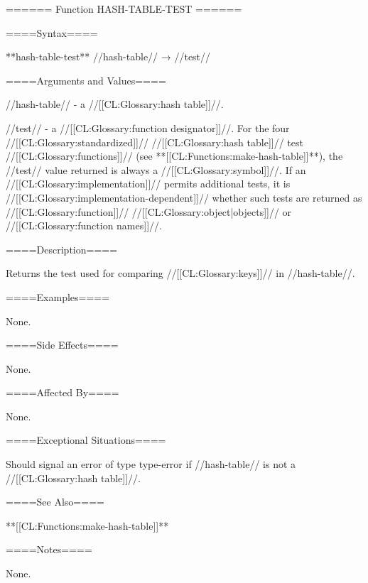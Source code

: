 ====== Function HASH-TABLE-TEST ======

====Syntax====

**hash-table-test** //hash-table// → //test//

====Arguments and Values====

//hash-table// - a //[[CL:Glossary:hash table]]//.

//test// - a //[[CL:Glossary:function designator]]//. For the four //[[CL:Glossary:standardized]]// //[[CL:Glossary:hash table]]// test //[[CL:Glossary:functions]]// (see **[[CL:Functions:make-hash-table]]**), the //test// value returned is always a //[[CL:Glossary:symbol]]//. If an //[[CL:Glossary:implementation]]// permits additional tests, it is //[[CL:Glossary:implementation-dependent]]// whether such tests are returned as //[[CL:Glossary:function]]// //[[CL:Glossary:object|objects]]// or //[[CL:Glossary:function names]]//.

====Description====

Returns the test used for comparing //[[CL:Glossary:keys]]// in //hash-table//.

====Examples====

None.

====Side Effects====

None.

====Affected By====

None.

====Exceptional Situations====

Should signal an error of type type-error if //hash-table// is not a //[[CL:Glossary:hash table]]//.

====See Also====

**[[CL:Functions:make-hash-table]]**

====Notes====

None.

